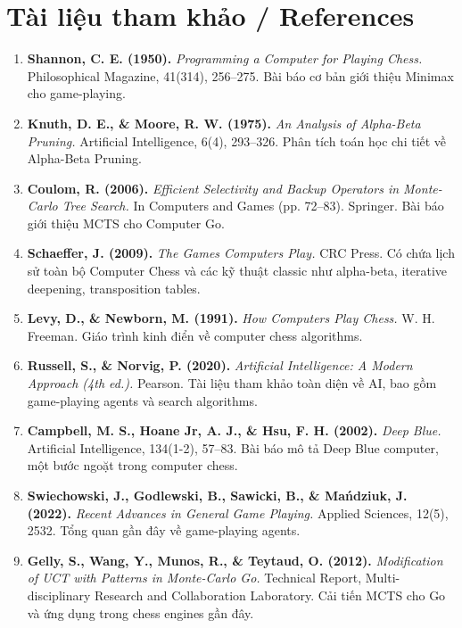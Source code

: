 \section{Tài liệu tham khảo / References}

\begin{enumerate}
    \item \textbf{Shannon, C. E. (1950).} \textit{Programming a Computer for Playing Chess.} Philosophical Magazine, 41(314), 256–275. Bài báo cơ bản giới thiệu Minimax cho game-playing.

    \item \textbf{Knuth, D. E., \& Moore, R. W. (1975).} \textit{An Analysis of Alpha-Beta Pruning.} Artificial Intelligence, 6(4), 293–326. Phân tích toán học chi tiết về Alpha-Beta Pruning.

    \item \textbf{Coulom, R. (2006).} \textit{Efficient Selectivity and Backup Operators in Monte-Carlo Tree Search.} In Computers and Games (pp. 72–83). Springer. Bài báo giới thiệu MCTS cho Computer Go.

    \item \textbf{Schaeffer, J. (2009).} \textit{The Games Computers Play.} CRC Press. Có chứa lịch sử toàn bộ Computer Chess và các kỹ thuật classic như alpha-beta, iterative deepening, transposition tables.

    \item \textbf{Levy, D., \& Newborn, M. (1991).} \textit{How Computers Play Chess.} W. H. Freeman. Giáo trình kinh điển về computer chess algorithms.

    \item \textbf{Russell, S., \& Norvig, P. (2020).} \textit{Artificial Intelligence: A Modern Approach (4th ed.).} Pearson. Tài liệu tham khảo toàn diện về AI, bao gồm game-playing agents và search algorithms.

    \item \textbf{Campbell, M. S., Hoane Jr, A. J., \& Hsu, F. H. (2002).} \textit{Deep Blue.} Artificial Intelligence, 134(1-2), 57–83. Bài báo mô tả Deep Blue computer, một bước ngoặt trong computer chess.

    \item \textbf{Swiechowski, J., Godlewski, B., Sawicki, B., \& Mańdziuk, J. (2022).} \textit{Recent Advances in General Game Playing.} Applied Sciences, 12(5), 2532. Tổng quan gần đây về game-playing agents.

    \item \textbf{Gelly, S., Wang, Y., Munos, R., \& Teytaud, O. (2012).} \textit{Modification of UCT with Patterns in Monte-Carlo Go.} Technical Report, Multi-disciplinary Research and Collaboration Laboratory. Cải tiến MCTS cho Go và ứng dụng trong chess engines gần đây.


\end{enumerate}
